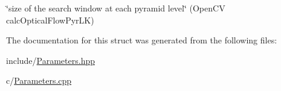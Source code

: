 \char`\"{}size of the search window at each pyramid level\char`\"{} (Open\-C\-V calc\-Optical\-Flow\-Pyr\-L\-K) 



The documentation for this struct was generated from the following files\-:\begin{DoxyCompactItemize}
\item 
include/\hyperlink{Parameters_8hpp}{Parameters.\-hpp}\item 
c/\hyperlink{Parameters_8cpp}{Parameters.\-cpp}\end{DoxyCompactItemize}
